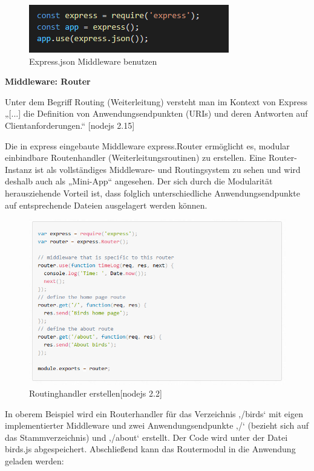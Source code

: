 \begin{figure}[h]
\centering
\includegraphics{images/nodejs_expressJson.PNG}
\caption{Express.json Middleware benutzen}
\end{figure}

\newpage
\textbf{Middleware: Router}
\newline

Unter dem Begriff Routing (Weiterleitung) versteht man im Kontext von Express „[...] die Definition von Anwendungsendpunkten (URIs) und deren Antworten auf Clientanforderungen.“ [nodejs 2.15]
\newline

Die in express eingebaute Middleware express.Router ermöglicht es, modular einbindbare Routenhandler (Weiterleitungsroutinen) zu erstellen. Eine Router-Instanz ist als vollständiges Middleware- und Routingsystem zu sehen und wird deshalb auch als „Mini-App“ angesehen. Der sich durch die Modularität herausziehende Vorteil ist, dass folglich unterschiedliche Anwendungsendpunkte auf entsprechende Dateien ausgelagert werden können.
\newline

\begin{figure}[h]
\centering
\includegraphics[width=14cm]{images/nodejs_expressRoutererstellen.PNG}
\caption{Routinghandler erstellen[nodejs 2.2]}
\end{figure}

In oberem Beispiel wird ein Routerhandler für das Verzeichnis ‚/birds‘ mit eigen implementierter Middleware und zwei Anwendungsendpunkte ‚/‘ (bezieht sich auf das Stammverzeichnis) und ‚/about‘ erstellt. Der Code wird unter der Datei birds.js abgespeichert. 
Abschließend kann das Routermodul in die Anwendung geladen werden: 
\newline

